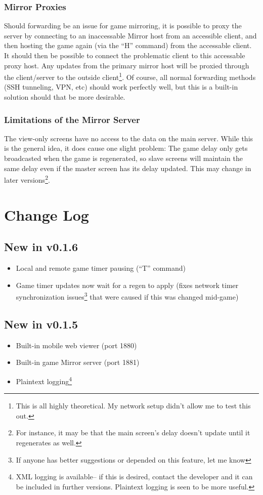 \documentclass[10pt,a4paper]{report}
\begin{document}
\subsection{Mirror Proxies}
Should forwarding be an issue for game mirroring, it is possible to proxy the server by connecting to an inaccessable Mirror host from an accessible client, and then hosting the game again (via the ``H'' command) from the accessable client.  It should then be possible to connect the problematic client to this accessable proxy host.  Any updates from the primary mirror host will be proxied through the client/server to the outside client\footnote{This is all highly theoretical.  My network setup didn't allow me to test this out.}.  Of course, all normal forwarding methods (SSH tunneling, VPN, etc) should work perfectly well, but this is a built-in solution should that be more desirable.

\subsection{Limitations of the Mirror Server}
The view-only screens have no access to the data on the main server.  While this is the general idea, it does cause one slight problem:  The game delay only gets broadcasted when the game is regenerated, so slave screens will maintain the same delay even if the master screen has its delay updated.  This may change in later versions\footnote{For instance, it may be that the main screen's delay doesn't update until it regenerates as well.}.

\chapter{Change Log}
\section{New in v0.1.6}
\begin{itemize}
\item Local and remote game timer pausing (``T'' command)
\item Game timer updates now wait for a regen to apply (fixes network timer synchronization issues\footnote{If anyone has better suggestions or depended on this feature, let me know} that were caused if this was changed mid-game)
\end{itemize}
\section{New in v0.1.5}
\begin{itemize}
\item Built-in mobile web viewer (port 1880)
\item Built-in game Mirror server (port 1881)
\item Plaintext logging\footnote{XML logging is available-- if this is desired, contact the developer and it can be included in further versions.  Plaintext logging is seen to be more useful.}
\end{itemize}
\end{document}
